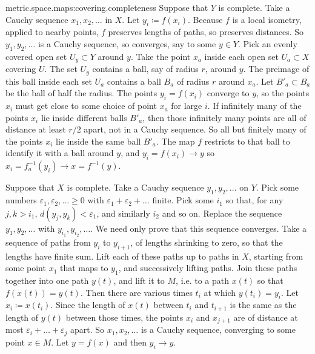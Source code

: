 \begin{answer}{metric.space.maps:covering.completeness}
Suppose that \(Y\) is complete.
Take a Cauchy sequence \(x_1,x_2,\dots\) in \(X\).
Let \(y_i\coloneqq f(x_i)\).
Because \(f\) is a local isometry, applied to nearby points, \(f\) preserves lengths of paths, so preserves distances.
So \(y_1, y_2, \dots\) is a Cauchy sequence, so converges, say to some \(y \in Y\).
Pick an evenly covered open set \(U_y \subset Y\) around \(y\).
Take the point \(x_a\) inside each open set \(U_a \subset X\) covering \(U\).
The set \(U_y\) contains a ball, say of radius \(r\), around \(y\).
The preimage of this ball inside each set \(U_a\) contains a ball \(B_a\) of radius \(r\) around \(x_a\).
Let \(B'_a \subset B_a\) be the ball of half the radius.
The points \(y_i=f(x_i)\) converge to \(y\), so the points \(x_i\) must get close to some choice of point \(x_a\) for large \(i\).
If infinitely many of the points \(x_i\) lie inside different balls \(B'_a\), then those infinitely many points are all of distance at least \(r/2\) apart, not in a Cauchy sequence.
So all but finitely many of the points \(x_i\) lie inside the same ball \(B'_a\).
The map \(f\) restricts to that ball to identify it with a ball around \(y\), and \(y_i=f(x_i) \to y\) so \(x_i=f^{-1}_a(y_i) \to x=f^{-1}(y)\).

Suppose that \(X\) is complete.
Take a Cauchy sequence \(y_1, y_2, \dots\) on \(Y\).
Pick some numbers \(\varepsilon_1, \varepsilon_2, \dots \ge 0\) with \(\varepsilon_1 + \varepsilon_2 + \dots\) finite.
Pick some \(i_1\) so that, for any \(j,k > i_1\), \(d(y_j,y_k)<\varepsilon_1\), and similarly \(i_2\) and so on.
Replace the sequence \(y_1, y_2, \dots\) with \(y_{i_1}, y_{i_2}, \dots\).
We need only prove that this sequence converges.
Take a sequence of paths from \(y_i\) to \(y_{i+1}\), of lengths shrinking to zero, so that the lengths have finite sum.
Lift each of these paths up to paths in \(X\), starting from some point \(x_1\) that maps to \(y_1\), and successively lifting paths.
Join these paths together into one path \(y(t)\), and lift it to \(M\), i.e. to a path \(x(t)\) so that \(f(x(t))=y(t)\).
Then there are various times \(t_i\) at which \(y(t_i)=y_i\).
Let \(x_i \coloneqq x(t_i)\).
Since the length of \(x(t)\) between \(t_i\) and \(t_{i+1}\) is the same as the length of \(y(t)\) between those times, the points \(x_i\) and \(x_{j+1}\) are of distance at most \(\varepsilon_i+\dots+\varepsilon_j\) apart.
So \(x_1, x_2, \dots\) is a Cauchy sequence, converging to some point \(x \in M\).
Let \(y=f(x)\) and then \(y_i \to y\).
\end{answer}

